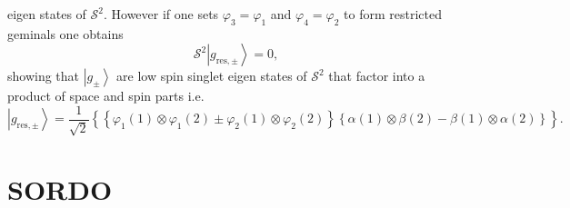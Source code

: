 \documentclass[aps,preprint]{revtex4}%
\begin{document}
eigen states of $\mathcal{S}^{2}$. However if one sets $\varphi_{3}%
=\varphi_{1}$ and $\varphi_{4}=\varphi_{2}$ to form restricted geminals one
obtains
\begin{equation}
\mathcal{S}^{2}\left\vert g_{\text{res},\pm}\right\rangle =0,
\end{equation}
showing that $\left\vert g_{\pm}\right\rangle $ are low spin singlet eigen
states of $\mathcal{S}^{2}$ that factor into a product of space and spin parts
i.e.
\begin{equation}
\left\vert g_{\text{res},\pm}\right\rangle =\frac{1}{\sqrt{2}}\left\{
\left\{  \varphi_{1}\left(  1\right)  \otimes\varphi_{1}\left(  2\right)
\pm\varphi_{2}\left(  1\right)  \otimes\varphi_{2}\left(  2\right)  \right\}
\left\{  \alpha\left(  1\right)  \otimes\beta\left(  2\right)  -\beta\left(
1\right)  \otimes\alpha\left(  2\right)  \right\}  \right\}  .
\end{equation}


\section{SORDO\label{SORDO}}
\end{document}
